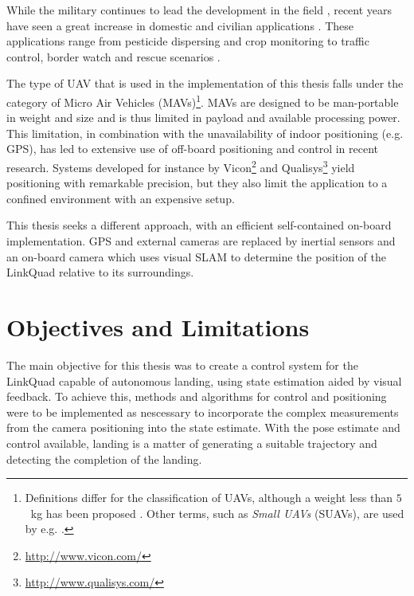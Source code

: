     While the military continues to lead the development in the field \citep{united2010u}, recent years
    have seen a great increase in domestic and civilian applications \citep{Wong_Bil_2006}.
    These applications range from pesticide dispersing and crop monitoring to
    traffic control, border watch and rescue scenarios \citep{Doherty_Rudol_2007}.

    The type of UAV that is used in the implementation of this thesis
    falls under the category of Micro Air Vehicles (MAVs)\footnote{Definitions differ for the classification of UAVs,
    although a weight less than $5$~kg has been proposed \citep{arjomandi:classification}.
    Other terms, such as \textit{Small UAVs} (SUAVs), are used by e.g. \citep{valavanis2007advances}.}.
    MAVs are designed to be man-portable in weight and size and is thus
    limited in payload and available processing power.
    This limitation, in combination with the unavailability of indoor positioning (e.g. GPS),
    has led to extensive use of off-board positioning and control in recent research.
    Systems developed for instance by Vicon\footnote{\url{http://www.vicon.com/}} and
    Qualisys\footnote{\url{http://www.qualisys.com/}} yield positioning with
    remarkable precision, but they also limit the application to a confined
    environment with an expensive setup.

    This thesis seeks a different approach, with an efficient self-contained
    on-board implementation. GPS and external cameras are replaced by inertial sensors and an
    on-board camera which uses visual SLAM to determine the position of the LinkQuad relative to
    its surroundings.








\section{Objectives and Limitations}
    The main objective for this thesis was to create a control system
    for the LinkQuad capable of autonomous landing, using state estimation
    aided by visual feedback.
    To achieve this, methods and algorithms for control and positioning
    were to be implemented as nescessary to incorporate the complex measurements
    from the camera positioning into the state estimate.
    With the pose estimate and control available, landing is a matter of generating
    a suitable trajectory and detecting the completion of the landing.

